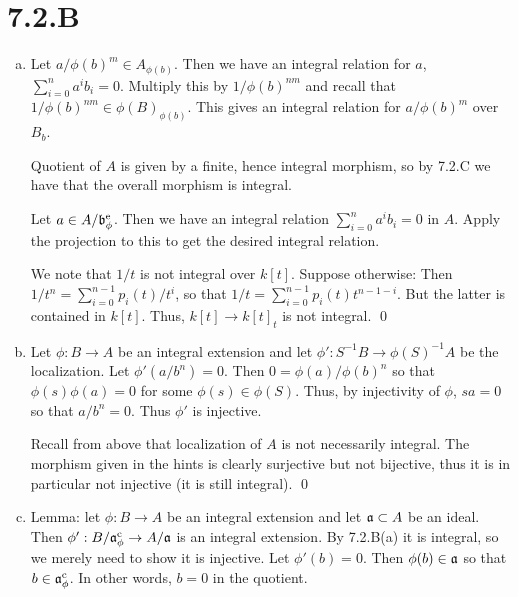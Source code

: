 \documentclass{article}
\begin{document}
\section{7.2.B}
\begin{enumerate}[a.]
    \item Let $a/\phi(b)^m \in A_{\phi(b)}$. Then we have an integral relation for
          $a$, $\sum_{i=0}^n a^ib_i=0$. Multiply this by
          $1/\phi(b)^{nm}$ and recall that $1/\phi(b)^{nm} \in \phi(B)_{\phi(b)}$. This gives an
          integral relation for $a/\phi(b)^m$ over $B_b$.

          Quotient of $A$ is given by a finite, hence integral
          morphism, so by 7.2.C we have that the overall morphism is integral.

          Let $a \in A/\mathfrak{b}^{\text{e}}_{\phi}$. Then we have an integral relation
          $\sum_{i=0}^n a^ib_i=0$ in $A$. Apply the projection to this
          to get the desired integral relation.

          We note that $1/t$ is not integral over
          $k[t]$. Suppose otherwise: Then $1/t^n=\sum_{i=0}^{n-1} p_i(t)/t^i$, so that
          $1/t=\sum_{i=0}^{n-1} p_i(t)t^{n-1-i}$. But the latter is contained in $k[t]$.
          Thus, $k[t] \to
              k[t]_t$ is not integral. \qed

    \item Let $\phi : B \to A$ be an integral extension and let
          $\phi' :
              S^{-1}B \to \phi(S)^{-1}A$ be the localization. Let $\phi'(a/b^n)=0$. Then
          $0=\phi(a)/\phi(b)^n$ so that $\phi(s)\phi(a)=0$ for some
          $\phi(s)
              \in
              \phi(S)$. Thus, by injectivity of $\phi$,
          $sa=0$ so that $a/b^n=0$. Thus
          $\phi'$ is injective.

          Recall from above that localization of $A$ is not
          necessarily integral. The morphism given in the hints is clearly surjective but
          not bijective, thus it is in particular not injective (it is still integral).
          \qed
    \item Lemma: let $\phi: B \to A$ be an integral extension and let
          $\mathfrak{a}
              \subset A$ be an ideal. Then $\phi': B/\mathfrak{a}^{\text{c}}_{\phi} \to
              A/\mathfrak{a}$ is an integral
          extension. By 7.2.B(a) it is integral, so we merely need to show it is
          injective. Let $\phi'(b)=0$. Then $\phi(b) \in \mathfrak{a}$ so that
          $b \in \mathfrak{a}^{\text{c}}_{\phi}$. In other words, $b = 0$ in the quotient.


\end{enumerate}
\end{document}
